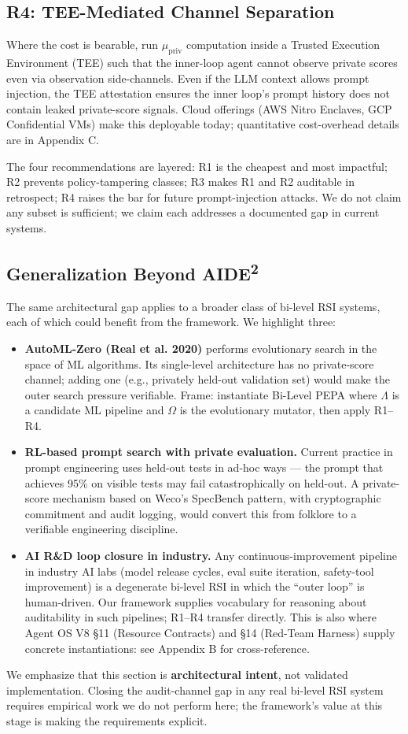 \subsection{R4: TEE-Mediated Channel Separation}

Where the cost is bearable, run $\mu_{\text{priv}}$ computation inside a Trusted Execution Environment (TEE) such that the inner-loop agent cannot observe private scores even via observation side-channels. Even if the LLM context allows prompt injection, the TEE attestation ensures the inner loop's prompt history does not contain leaked private-score signals. Cloud offerings (AWS Nitro Enclaves, GCP Confidential VMs) make this deployable today; quantitative cost-overhead details are in Appendix C.

The four recommendations are layered: R1 is the cheapest and most impactful; R2 prevents policy-tampering classes; R3 makes R1 and R2 auditable in retrospect; R4 raises the bar for future prompt-injection attacks. We do not claim any subset is sufficient; we claim each addresses a documented gap in current systems.

\subsection{Generalization Beyond AIDE\textsuperscript{2}}

The same architectural gap applies to a broader class of bi-level RSI systems, each of which could benefit from the framework. We highlight three:
\begin{itemize}
    \item \textbf{AutoML-Zero (Real et al. 2020)} performs evolutionary search in the space of ML algorithms. Its single-level architecture has no private-score channel; adding one (e.g., privately held-out validation set) would make the outer search pressure verifiable. Frame: instantiate Bi-Level PEPA where $\Lambda$ is a candidate ML pipeline and $\Omega$ is the evolutionary mutator, then apply R1--R4.
    \item \textbf{RL-based prompt search with private evaluation.} Current practice in prompt engineering uses held-out tests in ad-hoc ways --- the prompt that achieves 95\% on visible tests may fail catastrophically on held-out. A private-score mechanism based on Weco's SpecBench pattern, with cryptographic commitment and audit logging, would convert this from folklore to a verifiable engineering discipline.
    \item \textbf{AI R\&D loop closure in industry.} Any continuous-improvement pipeline in industry AI labs (model release cycles, eval suite iteration, safety-tool improvement) is a degenerate bi-level RSI in which the ``outer loop'' is human-driven. Our framework supplies vocabulary for reasoning about auditability in such pipelines; R1--R4 transfer directly. This is also where Agent OS V8 \S11 (Resource Contracts) and \S14 (Red-Team Harness) supply concrete instantiations: see Appendix B for cross-reference.
\end{itemize}

We emphasize that this section is \textbf{architectural intent}, not validated implementation. Closing the audit-channel gap in any real bi-level RSI system requires empirical work we do not perform here; the framework's value at this stage is making the requirements explicit.
